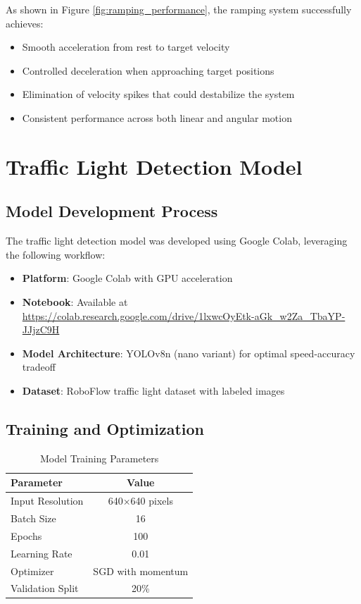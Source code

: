 \documentclass[12pt,a4paper]{article}
\begin{document}
	As shown in Figure \ref{fig:ramping_performance}, the ramping system successfully achieves:
	\begin{itemize}
		\item Smooth acceleration from rest to target velocity
		\item Controlled deceleration when approaching target positions
		\item Elimination of velocity spikes that could destabilize the system
		\item Consistent performance across both linear and angular motion
	\end{itemize}
	
	\section{Traffic Light Detection Model}
	
	\subsection{Model Development Process}
	
	The traffic light detection model was developed using Google Colab, leveraging the following workflow:
	
	\begin{itemize}
		\item \textbf{Platform}: Google Colab with GPU acceleration
		\item \textbf{Notebook}: Available at \url{https://colab.research.google.com/drive/1lxwcOyEtk-aGk_w2Za_TbaYP-JJjzC9H}
		\item \textbf{Model Architecture}: YOLOv8n (nano variant) for optimal speed-accuracy tradeoff
		\item \textbf{Dataset}: RoboFlow traffic light dataset with labeled images
	\end{itemize}
	
	\subsection{Training and Optimization}
	
	\begin{table}[H]
		\centering
		\begin{tabular}{|l|c|}
			\hline
			\textbf{Parameter} & \textbf{Value} \\
			\hline
			Input Resolution & 640×640 pixels \\
			Batch Size & 16 \\
			Epochs & 100 \\
			Learning Rate & 0.01 \\
			Optimizer & SGD with momentum \\
			Validation Split & 20\% \\
			\hline
		\end{tabular}
		\caption{Model Training Parameters}
	\end{table}
	
\end{document}
